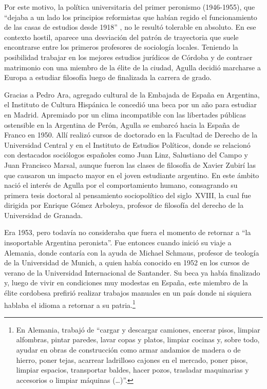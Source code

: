 Por este motivo, la política universitaria del primer peronismo (1946-1955), que \enquote{dejaba a un lado los principios reformistas que habían regido el funcionamiento de las casas de estudios desde 1918} \parencite[152]{1536-BUCHBINDER2010}, no le resultó tolerable en absoluto. En ese contexto hostil, aparece una desviación del patrón de trayectoria que suele encontrarse entre los primeros profesores de sociología locales. Teniendo la posibilidad trabajar en los mejores estudios jurídicos de Córdoba y de contraer matrimonio con una miembro de la élite de la ciudad, Agulla decidió marcharse a Europa a estudiar filosofía luego de finalizada la carrera de grado.

Gracias a Pedro Ara, agregado cultural de la Embajada de España en Argentina, el Instituto de Cultura Hispánica le concedió una beca por un año para estudiar en Madrid. Apremiado por un clima incompatible con las libertades públicas ostensible en la Argentina de Perón, Agulla se embarcó hacia la España de Franco en 1950. Allí realizó cursos de doctorado en la Facultad de Derecho de la Universidad Central y en el Instituto de Estudios Políticos, donde se relacionó con destacados sociólogos españoles como Juan Linz, Salustiano del Campo y Juan Francisco Marsal, aunque fueron las clases de filosofía de Xavier Zubirí las que causaron un impacto mayor en el joven estudiante argentino. En este ámbito nació el interés de Agulla por el comportamiento humano, consagrando su primera tesis doctoral al pensamiento sociopolítico del siglo~XVIII, la cual fue dirigida por Enrique Gómez Arboleya, profesor de filosofía del derecho de la Universidad de Granada.

Era 1953, pero todavía no consideraba que fuera el momento de retornar a \enquote{la insoportable Argentina peronista}. Fue entonces cuando inició su viaje a Alemania, donde contaría con la ayuda de Michael Schmaus, profesor de teología de la Universidad de Munich, a quien había conocido en 1952 en los cursos de verano de la Universidad Internacional de Santander. Su beca ya había finalizado y, luego de vivir en condiciones muy modestas en España, este miembro de la élite cordobesa prefirió realizar trabajos manuales en un país donde ni siquiera hablaba el idioma a retornar a su patria.\footnote{En Alemania, \textcite[31]{1634-AGULLA1997} trabajó de \enquote{cargar y descargar camiones, encerar pisos, limpiar alfombras, pintar paredes, lavar copas y platos, limpiar cocinas y, sobre todo, ayudar en obras de construcción como armar andamios de madera o de hierro, poner tejas, acarrear ladrilloso cajones en el mercado, poner pisos, limpiar espacios, transportar baldes, hacer pozos, trasladar maquinarias y accesorios o limpiar máquinas (\dots)}.}

